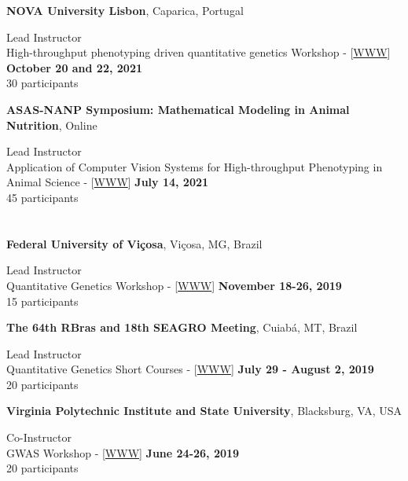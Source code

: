 \documentclass[margin,line,10pt]{res}
\begin{document}
\begin{resume}
{\bf NOVA University Lisbon}, Caparica, Portugal
\vspace{.01pt}

Lead Instructor  \\
High-throughput phenotyping driven quantitative genetics Workshop - [\textcolor{blue}{\href{http://morotalab.org/CMA-FCT-NOVA2021/CMA-FCT-NOVA2021.html}{WWW}}]
\hfill {\bf October 20 and 22, 2021} \\
30 participants



{\bf ASAS-NANP Symposium: Mathematical Modeling in Animal Nutrition}, Online
\vspace{.01pt}

Lead Instructor  \\
Application of Computer Vision Systems for High-throughput Phenotyping in Animal Science - [\textcolor{blue}{\href{http://morotalab.org/guestlectures/2020/NANP/handson/PreASAS.pdf}{WWW}}]
\hfill {\bf July 14, 2021} \\
45 participants




\section{}

{\bf Federal University of Vi\c cosa}, Vi\c cosa, MG, Brazil
\vspace{.01pt}

Lead Instructor  \\
Quantitative Genetics Workshop - [\textcolor{blue}{\href{http://morotalab.org/UFV2019/UFV2019.html}{WWW}}]
\hfill {\bf November 18-26, 2019} \\
15 participants


{\bf The 64th RBras and 18th SEAGRO Meeting}, Cuiab{\'a}, MT, Brazil
\vspace{.01pt}

Lead Instructor  \\
    Quantitative Genetics Short Courses - [\textcolor{blue}{\href{http://morotalab.org/RBras2019/RBras2019.html}{WWW}}]
\hfill {\bf  July 29 - August 2, 2019} \\
20 participants 


{\bf Virginia Polytechnic Institute and State University}, Blacksburg, VA, USA
\vspace{.01pt}

Co-Instructor  \\
GWAS Workshop - [\textcolor{blue}{\href{http://morotalab.org/VTGWAS2019/VTGWAS2019.html}{WWW}}]
\hfill {\bf June 24-26, 2019} \\
20 participants 



\end{resume}
\end{document}
